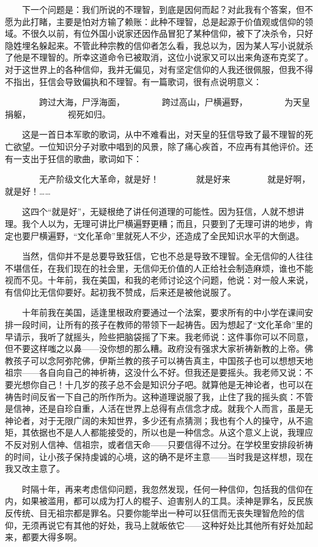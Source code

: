 　　下一个问题是：我们所说的不理智，到底是因何而起？对此我有个答案，但不愿为此打睹，主要是怕对方输了赖账：此种不理智，总是起源于价值观或信仰的领域。不很久以前，有位外国小说家还因作品冒犯了某种信仰，被下了决杀令，只好隐姓埋名躲起来。不管此种宗教的信仰者怎么看，我总以为，因为某人写小说就杀了他是不理智的。所幸这道命令已被取消，这位小说家又可以出来角逐布克奖了。对于这世界上的各种信仰，我并无偏见，对有坚定信仰的人我还很佩服，但我不得不指出，狂信会导致偏执和不理智。有一篇歌词，很有点说明意义： 

　　　　跨过大海，尸浮海面， 　　　　跨过高山，尸横遍野， 　　　　为天皇捐躯， 　　　　视死如归。 

　　这是一首日本军歌的歌词，从中不难看出，对天皇的狂信导致了最不理智的死亡欲望。一位知识分子对歌中唱到的风景，除了痛心疾首，不应再有其他评价。还有一支出于狂信的歌曲，歌词如下： 

　　　　无产阶级文化大革命，就是好！ 　　　　就是好来 　　　　就是好啊，就是好！…… 

　　这四个“就是好”，无疑根绝了讲任何道理的可能性。因为狂信，人就不想讲理。我个人以为，无理可讲比尸横遍野更糟；而且，只要到了无理可讲的地步，肯定也要尸横遍野，“文化革命”里就死人不少，还造成了全民知识水平的大倒退。 

　　当然，信仰并不是总要导致狂信，它也不总是导致不理智。全无信仰的人往往不堪信任，在我们现在的社会里，无信仰无价值的人正给社会制造麻烦，谁也不能视而不见。十年前，我在美国，和我的老师讨论这个问题，他说：对一般人来说，有信仰比无信仰要好。起初我不赞成，后来还是被他说服了。 

　　十年前我在美国，适逢里根政府要通过一个法案，要求所有的中小学在课间安排一段时间，让所有的孩子在教师的带领下一起祷告。因为想起了“文化革命”里的早请示，我听了就摇头，险些把脑袋摇了下来。我老师说：这件事你可以不同意，但不要这样嗤之以鼻——没你想的那么糟。政府没有强求大家祈祷新教的上帝。佛教孩子可以念阿弥陀佛，伊斯兰教的孩子可以祷告真主，中国孩子也可以想想天地祖宗——各自向自己的神祈祷，这没什么不好。但我还是要摇头。我老师又说：不要光想你自己！十几岁的孩子总不会是知识分子吧。就算他是无神论者，也可以在祷告时间反省一下自己的所作所为。这种道理说服了我，止住了我的摇头疯：不管是信神，还是自珍自重，人活在世界上总得有点信念才成。就我个人而言，虽是无神论者，对于无限广阔的未知世界，多少还有点猜测；我也有个人的操守，从不逾矩，其依据也不是人人都能接受的，所以也是一种信念。从这个意义上说，我理应不反对别人信神、信祖宗，或者信天命——只要信得不过分。在学校里安排段祈祷的时间，让小孩子保持虔诚的心境，这的确不是坏主意——当时我是这样想，现在我又改主意了。 

　　时隔十年，再来考虑信仰问题，我忽然发现，任何一种信仰，包括我的信仰在内，如果被滥用，都可以成为打人的棍子、迫害别人的工具。渎神是罪名，反民族反传统、目无祖宗都是罪名。只要你能举出一种可以狂信而无丧失理智危险的信仰，无须再说它有其他的好处，我马上就皈依它——这种好处比其他所有好处加起来，都要大得多啊。 


